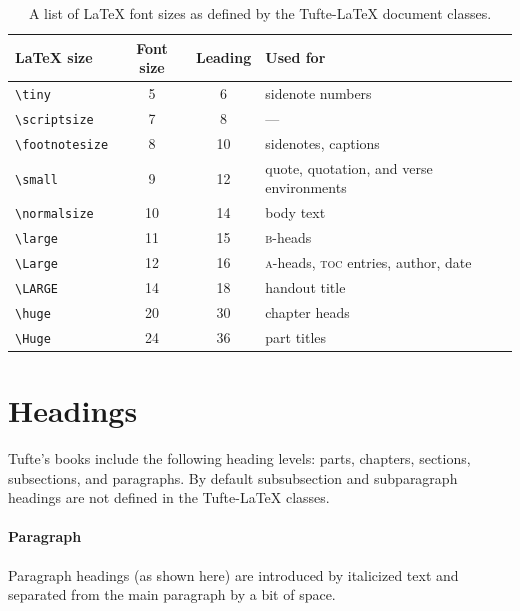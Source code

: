 \documentclass[a4paper]{tufte-book}
\newcommand{\TL}{Tufte-\LaTeX\xspace}
\newcommand{\na}{\quad---}
\begin{document}
\begin{table}[h]
  \footnotesize%
  \begin{center}
    \begin{tabular}{lccl}
      \toprule
      \LaTeX{} size & Font size & Leading & Used for \\
      \midrule
      \Verb|\tiny|         &  5 &  6 & sidenote numbers \\
      \Verb|\scriptsize|   &  7 &  8 & \na \\
      \Verb|\footnotesize| &  8 & 10 & sidenotes, captions \\
      \Verb|\small|        &  9 & 12 & quote, quotation, and verse environments \\
      \Verb|\normalsize|   & 10 & 14 & body text \\
      \Verb|\large|        & 11 & 15 & \textsc{b}-heads \\
      \Verb|\Large|        & 12 & 16 & \textsc{a}-heads, \textsc{toc} entries, author, date \\
      \Verb|\LARGE|        & 14 & 18 & handout title \\
      \Verb|\huge|         & 20 & 30 & chapter heads \\
      \Verb|\Huge|         & 24 & 36 & part titles \\
      \bottomrule
    \end{tabular}
  \end{center}
  \caption{A list of \LaTeX{} font sizes as defined by the \TL document classes.}\label{tab:font-sizes}
\end{table}


\section{Headings}\label{sec:headings}

Tufte's books include the following heading levels: parts, chapters,%
sections, subsections, and paragraphs. 
By default subsubsection and subparagraph headings are not defined in the \TL classes.%

\paragraph{Paragraph} Paragraph headings (as shown here) are introduced by italicized text and separated from the main paragraph by a bit of space.
\end{document}
